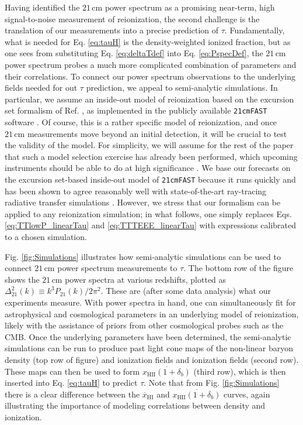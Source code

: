 \documentclass[twocolumn,aps,prd,nofootinbib,showpacs]{revtex4-1}
\begin{document}
Having identified the $21\,\textrm{cm}$ power spectrum as a promising near-term, high signal-to-noise measurement of reionization, the second challenge is the translation of our measurements into a precise prediction of $\tau$. Fundamentally, what is needed for Eq. \eqref{eq:tauH} is the density-weighted ionized fraction, but as one sees from substituting Eq. \eqref{eq:deltaTdef} into Eq. \eqref{eq:PspecDef}, the $21\,\textrm{cm}$ power spectrum probes a much more complicated combination of parameters and their correlations. To connect our power spectrum observations to the underlying fields needed for out $\tau$ prediction, we appeal to semi-analytic simulations. In particular, we assume an inside-out model of reionization based on the excursion set formalism of Ref. \cite{furlanetto_et_al2004}, as implemented in the publicly available {\tt 21cmFAST} software \cite{mesinger_et_al2011}. Of course, this is a rather specific model of reionization, and once $21\,\textrm{cm}$ measurements move beyond an initial detection, it will be crucial to test the validity of the model. For simplicity, we will assume for the rest of the paper that such a model selection exercise has already been performed, which upcoming instruments should be able to do at high significance \cite{watkinson_and_pritchard2014}. We base our forecasts on the excursion set-based inside-out model of {\tt 21cmFAST} because it runs quickly and has been shown to agree reasonably well with state-of-the-art ray-tracing radiative transfer simulations \cite{zahn_et_al2011}. However, we stress that our formalism can be applied to any reionization simulation; in what follows, one simply replaces Eqs. \eqref{eq:TTlowP_linearTau} and \eqref{eq:TTTEEE_linearTau} with expressions calibrated to a chosen simulation.

Fig. \ref{fig:Simulations} illustrates how semi-analytic simulations can be used to connect $21\,\textrm{cm}$ power spectrum measurements to $\tau$. The bottom row of the figure shows the $21\,\textrm{cm}$ power spectra at various redshifts, plotted as $\Delta^2_{21} (k) \equiv k^3 P_{21}(k) / 2 \pi^2$. These are (after some data analysis) what our experiments measure. With power spectra in hand, one can simultaneously fit for astrophysical and cosmological parameters in an underlying model of reionization, likely with the assistance of priors from other cosmological probes such as the CMB. Once the underlying parameters have been determined, the semi-analytic simulations can be run to produce past light cone maps of the non-linear baryon density (top row of figure) and ionization fields and ionization fields (second row). These maps can then be used to form $\overline{x_\textrm{HII} (1+ \delta_b)}$ (third row), which is then inserted into Eq. \eqref{eq:tauH} to predict $\tau$. Note that from Fig. \ref{fig:Simulations} there is a clear difference between the $\overline{x}_\textrm{HI}$ and $\overline{x_\textrm{HII} (1+ \delta_b)}$ curves, again illustrating the importance of modeling correlations between density and ionization.
\end{document}
